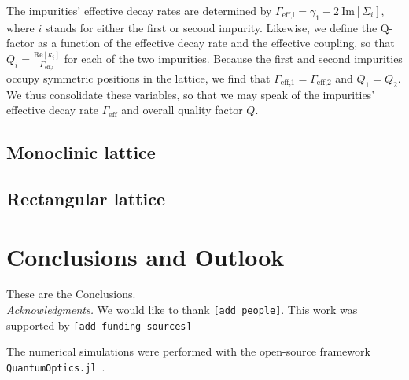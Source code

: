 \documentclass[aps,pra,superscriptaddress,twocolumn]{revtex4-1}
\newcommand{\re}{\mathrm{Re}}
\newcommand{\im}{\mathrm{Im}}
\newcommand{\commentSO}[1]{\texttt{\color{orange}[#1]}}
\newcommand{\commentTP}[1]{\texttt{\color{green}[#1]}}
\begin{document}
The impurities' effective decay rates are determined by $\Gamma_\text{eff,i} = \gamma_1 - 2~\im[\Sigma_i]$, where $i$ stands for either the first or second impurity. Likewise, we define the Q-factor as a function of the effective decay rate and the effective coupling, so that $ Q_i = \frac{\re[\kappa_i]}{\Gamma_\text{eff,i}} $ for each of the two impurities. Because the first and second impurities occupy symmetric positions in the lattice, we find that $\Gamma_\text{eff,1} = \Gamma_\text{eff,2}$ and $Q_1 = Q_2$. We thus consolidate these variables, so that we may speak of the impurities' effective decay rate $\Gamma_\text{eff}$ and overall quality factor $Q$. 




\subsection{Monoclinic lattice}


\subsection{Rectangular lattice}


\section{Conclusions and Outlook}\label{sec:conclusion}

These are the Conclusions.\\[2ex]

\emph{Acknowledgments.} We would like to thank \commentSO{add people}. This work was supported by \commentSO{add funding sources}

The numerical simulations were performed with the open-source framework \texttt{QuantumOptics.jl}~\cite{kramer_quantumopticsjl_2018}.




\end{document}
